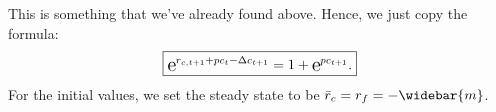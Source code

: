 	This is something that we've already found above. Hence, we just copy the formula:
\begin{equation}
	\boxed{\e{r_{c,t+1} + pc_{t} - \Delta c_{t+1}} = 1 + \e{pc_{t+1}}.}
\end{equation}
For the initial values, we set the steady state to be $\bar{r}_c = r_f = -\widebar{m}$.